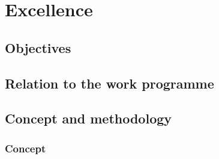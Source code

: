 \chapter{Excellence}



\section{Objectives}



\section{Relation to the work programme}



\section{Concept and methodology}

\newcommand{\cmsection}[1]{\bigskip\par\noindent\stepcounter{cmsec}\currentpdfbookmark{--- #1}{\thecmsec}{\bf \large \underline{#1}}\medskip}

\subsection{Concept}\label{concept}

  

